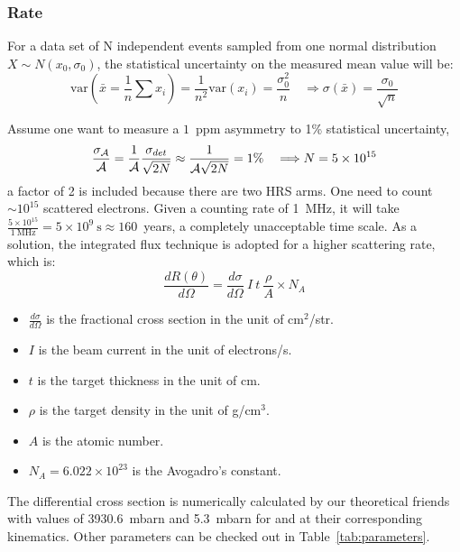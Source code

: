 \subsubsection{Rate}
For a data set of N independent events sampled from one normal distribution 
$X\sim N(x_0, \sigma_0)$, the statistical uncertainty on the measured mean value
will be:
$$ \text{var}(\bar{x} = \frac{1}{n}\sum x_i) = \frac{1}{n^2}\text{var}(x_i) = \frac{\sigma_0^2}{n} 
\quad \Longrightarrow \sigma(\bar{x}) = \frac{\sigma_0}{\sqrt{n}} $$

Assume one want to measure a $1$~ppm asymmetry to 1\% statistical uncertainty,
\begin{equation}
    \frac{\sigma_{\mathcal{A}}}{\mathcal{A}} = \frac{1}{\mathcal{A}}\frac{\sigma_{det}}{\sqrt{2N}} 
    \approx \frac{1}{\mathcal{A}\sqrt{2N}} = 1\% \quad 
    \Longrightarrow N = 5 \times 10^{15} 
    \label{eq:statistical_error}
\end{equation}
a factor of 2 is included because there are two HRS arms.
One need to count $\sim10^{15}$ scattered electrons. Given a counting rate of 1~MHz, 
it will take $\frac{5\times 10^{15}}{1\ \mathrm{MHz}} = 5\times 10^{9}\ \mathrm{s} \approx 160$~years,
a completely unacceptable time scale. As a solution, the integrated flux technique is
adopted for a higher scattering rate, which is:
\begin{equation}
    \frac{dR(\theta)}{d\Omega} = \frac{d\sigma}{d\Omega}\ I\ t\ \frac{\rho}{A} \times N_A   
\end{equation}
\begin{itemize}
    \item $\frac{d\sigma}{d\Omega}$ is the fractional cross section in the unit of $\mathrm{cm}^2$/str.
    \item $I$ is the beam current in the unit of electrons/s.
    \item $t$ is the target thickness in the unit of cm.
    \item $\rho$ is the target density in the unit of g/cm${}^3$.
    \item $A$ is the atomic number.
    \item $N_A = 6.022\times 10^{23}$ is the Avogadro's constant.
\end{itemize}

The differential cross section is numerically calculated by our theoretical friends
with values of 3930.6~mbarn and 5.3~mbarn for \Pb and \Ca at their corresponding
kinematics. Other parameters can be checked out in Table~\ref{tab:parameters}.

